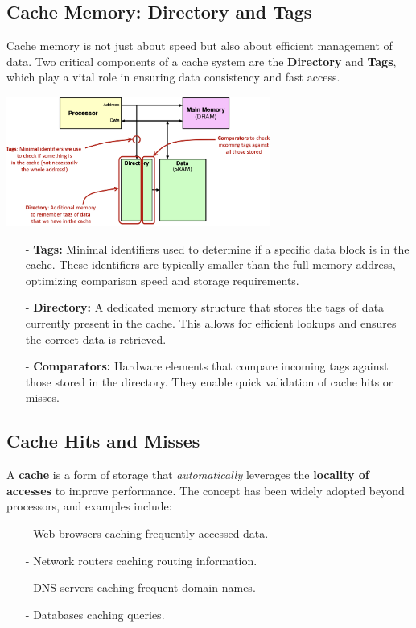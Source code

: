 \subsection{Cache Memory: Directory and Tags}
Cache memory is not just about speed but also about efficient management of data. Two critical components of a cache system are the \textbf{Directory} and \textbf{Tags}, which play a vital role in ensuring data consistency and fast access.
\begin{center}
    \includegraphics[width=0.65\textwidth]{chapters/chapter3a/images/cache2.png}
\end{center}
\begin{itemize}
    \item[-] \textbf{Tags:} Minimal identifiers used to determine if a specific data block is in the cache. These identifiers are typically smaller than the full memory address, optimizing comparison speed and storage requirements.
    \item[-] \textbf{Directory:} A dedicated memory structure that stores the tags of data currently present in the cache. This allows for efficient lookups and ensures the correct data is retrieved.
    \item[-] \textbf{Comparators:} Hardware elements that compare incoming tags against those stored in the directory. They enable quick validation of cache hits or misses.
\end{itemize}

\subsection{Cache Hits and Misses}
A \textbf{cache} is a form of storage that \textit{automatically} leverages the \textbf{locality of accesses} to improve performance. The concept has been widely adopted beyond processors, and examples include:

\begin{itemize}
    \item[-] Web browsers caching frequently accessed data.
    \item[-] Network routers caching routing information.
    \item[-] DNS servers caching frequent domain names.
    \item[-] Databases caching queries.
\end{itemize}

